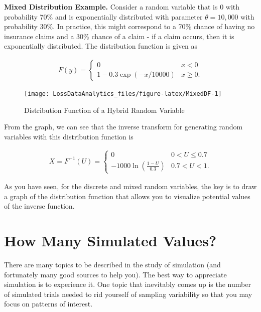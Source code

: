\documentclass[]{book}
\theoremstyle{definition}
\theoremstyle{definition}
\theoremstyle{definition}
\theoremstyle{remark}
\begin{document}
\textbf{Mixed Distribution Example.} Consider a random variable that is
0 with probability 70\% and is exponentially distributed with parameter
\(\theta= 10,000\) with probability 30\%. In practice, this might
correspond to a 70\% chance of having no insurance claims and a 30\%
chance of a claim - if a claim occurs, then it is exponentially
distributed. The distribution function is given as

\[\begin{aligned}
F(y) = \left\{ \begin{array}{cc}
              0 &  x<0  \\
              1 - 0.3 \exp(-x/10000) & x \ge 0 .
            \end{array} \right.\end{aligned}\]

\begin{figure}

{\centering \texttt{[image: LossDataAnalytics\_files/figure-latex/MixedDF-1]} 

}

\caption{Distribution Function of a Hybrid Random Variable}\label{fig:MixedDF}
\end{figure}

From the graph, we can see that the inverse transform for generating
random variables with this distribution function is

\[\begin{aligned}
X = F^{-1}(U) = \left\{ \begin{array}{cc}
              0 &  0< U  \leq  0.7  \\
              -1000 \ln (\frac{1-U}{0.3}) & 0.7 < U < 1 .
            \end{array} \right.\end{aligned}\]

As you have seen, for the discrete and mixed random variables, the key
is to draw a graph of the distribution function that allows you to
visualize potential values of the inverse function.

\section{How Many Simulated Values?}\label{how-many-simulated-values}

There are many topics to be described in the study of simulation (and
fortunately many good sources to help you). The best way to appreciate
simulation is to experience it. One topic that inevitably comes up is
the number of simulated trials needed to rid yourself of sampling
variability so that you may focus on patterns of interest.
\end{document}
